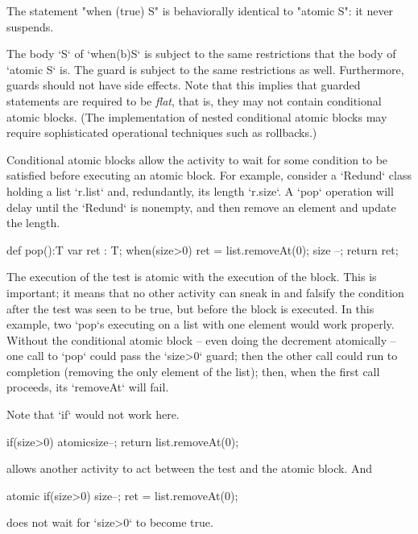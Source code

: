 The statement \xcd"when (true) S" is behaviorally identical to
\xcd"atomic S": it never suspends. 

The body \xcd`S` of \xcd`when(b)S` is subject to the same restrictions that
the body of \xcd`atomic S` is.  The guard is subject to the same restrictions
as well.  Furthermore, guards should not have side effects.
Note that this implies that guarded statements are required to be {\em
flat}, that is, they may not contain conditional atomic blocks. (The
implementation of nested conditional atomic blocks may require
sophisticated operational techniques such as rollbacks.)

Conditional atomic blocks allow the activity to wait for some condition to be
satisfied before executing an atomic block. For example, consider a
\xcd`Redund` class holding a list \xcd`r.list` and, redundantly, its length
\xcd`r.size`.  A \xcd`pop` operation will delay until the \xcd`Redund` is
nonempty, and then remove an element and update the length.  
\begin{xten}
def pop():T {
  var ret : T;
  when(size>0) {
    ret = list.removeAt(0);
    size --;
    }
  return ret;
}
\end{xten}

The execution of the test is atomic with the execution of the block.  This is
important; it means that no other activity can sneak in and falsify the condition
after the test was seen to be true, but 
before the block is executed.  In this example, two \xcd`pop`s
executing on a list with one element would work properly. Without the
conditional atomic block -- even doing the decrement atomically -- one call to
\xcd`pop` could pass the \xcd`size>0` guard; then the other call could run to
completion (removing the only element of the list); then, when the first call
proceeds, its \xcd`removeAt` will fail.  

Note that \xcd`if` would not work here.  
\begin{xtenmath}
if(size>0) atomic{size--; return list.removeAt(0);}
\end{xtenmath} 
allows another
activity to act between the test and the atomic block.  
And 
\begin{xtenmath}
atomic{ if(size>0) {size--; ret = list.removeAt(0);}}
\end{xtenmath}
does not wait for \xcd`size>0` to become true.

